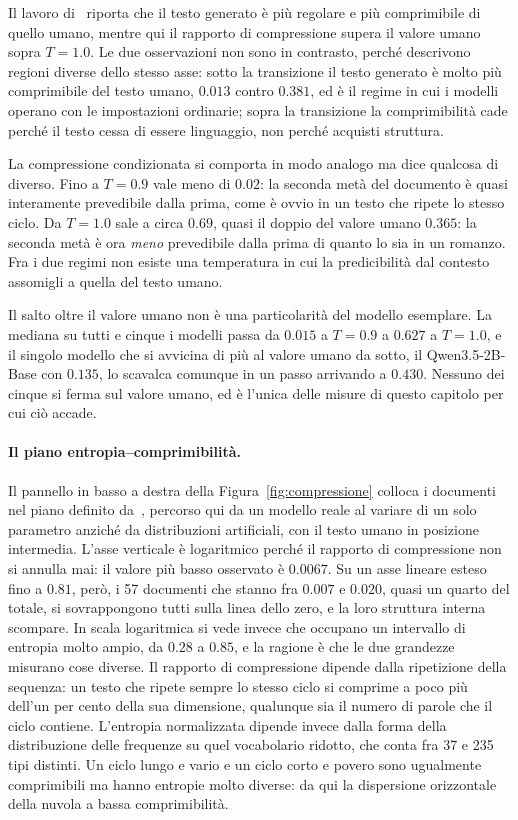 Il lavoro di~\cite{hadad2026} riporta che il testo generato è più regolare e
più comprimibile di quello umano, mentre qui il rapporto di compressione
supera il valore umano sopra $T = 1.0$. Le due osservazioni non sono in
contrasto, perché descrivono regioni diverse dello stesso asse: sotto la
transizione il testo generato è molto più comprimibile del testo umano,
$0.013$ contro $0.381$, ed è il regime in cui i modelli operano con le
impostazioni ordinarie; sopra la transizione la comprimibilità cade perché il
testo cessa di essere linguaggio, non perché acquisti struttura.

La compressione condizionata si comporta in modo analogo ma dice qualcosa di
diverso. Fino a $T = 0.9$ vale meno di $0.02$: la seconda metà del documento è
quasi interamente prevedibile dalla prima, come è ovvio in un testo che ripete
lo stesso ciclo. Da $T = 1.0$ sale a circa $0.69$, quasi il doppio del valore
umano $0.365$: la seconda metà è ora \emph{meno} prevedibile dalla prima di
quanto lo sia in un romanzo. Fra i due regimi non esiste una temperatura in cui
la predicibilità dal contesto assomigli a quella del testo umano.

Il salto oltre il valore umano non è una particolarità del modello esemplare. La
mediana su tutti e cinque i modelli passa da $0.015$ a $T = 0.9$ a $0.627$ a
$T = 1.0$, e il singolo modello che si avvicina di più al valore umano da sotto,
il Qwen3.5-2B-Base con $0.135$, lo scavalca comunque in un passo arrivando a
$0.430$. Nessuno dei cinque si ferma sul valore umano, ed è l'unica delle misure
di questo capitolo per cui ciò accade.

\paragraph{Il piano entropia--comprimibilità.}
Il pannello in basso a destra della Figura~\ref{fig:compressione} colloca i
documenti nel piano definito da~\cite{hadad2026}, percorso qui da un modello
reale al variare di un solo parametro anziché da distribuzioni artificiali, con
il testo umano in posizione intermedia. L'asse verticale è logaritmico perché il rapporto di compressione
non si annulla mai: il valore più basso osservato è $0.0067$. Su un asse
lineare esteso fino a $0.81$, però, i 57 documenti che stanno fra $0.007$ e
$0.020$, quasi un quarto del totale, si sovrappongono tutti sulla linea dello
zero, e la loro struttura interna scompare. In scala logaritmica si vede
invece che occupano un intervallo di entropia molto ampio, da $0.28$ a $0.85$,
e la ragione è che le due grandezze misurano cose diverse. Il rapporto di
compressione dipende dalla ripetizione della sequenza: un testo che ripete
sempre lo stesso ciclo si comprime a poco più dell'un per cento della sua
dimensione, qualunque sia il numero di parole che il ciclo contiene.
L'entropia normalizzata dipende invece dalla forma della distribuzione delle
frequenze su quel vocabolario ridotto, che conta fra 37 e 235 tipi distinti.
Un ciclo lungo e vario e un ciclo corto e povero sono ugualmente comprimibili
ma hanno entropie molto diverse: da qui la dispersione orizzontale della
nuvola a bassa comprimibilità.

